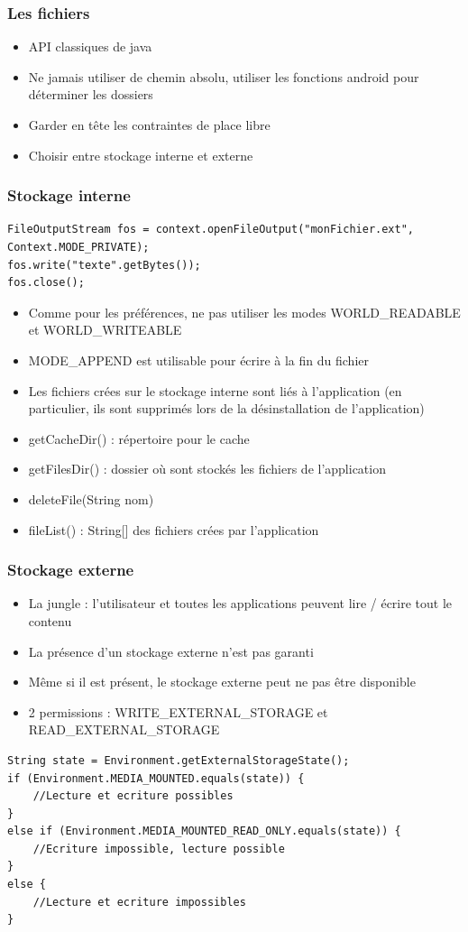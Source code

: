\documentclass{beamer}
\begin{document}
\begin{frame}[fragile]
\frametitle{Les fichiers}
\begin{itemize}
    \item API classiques de java
    \item Ne jamais utiliser de chemin absolu, utiliser les fonctions android pour déterminer les dossiers
    \item Garder en tête les contraintes de place libre
    \item Choisir entre stockage interne et externe
\end{itemize}
\end{frame}
\begin{frame}[fragile]
\frametitle{Stockage interne}
\begin{lstlisting}
FileOutputStream fos = context.openFileOutput("monFichier.ext", Context.MODE_PRIVATE);
fos.write("texte".getBytes());
fos.close();
\end{lstlisting}
\begin{itemize}
    \item Comme pour les préférences, ne pas utiliser les modes WORLD\_READABLE et WORLD\_WRITEABLE
    \item MODE\_APPEND est utilisable pour écrire à la fin du fichier
    \item Les fichiers crées sur le stockage interne sont liés à l'application (en particulier, ils sont supprimés lors de la désinstallation de l'application)
\end{itemize}
\begin{itemize}
    \item getCacheDir() : répertoire pour le cache
    \item getFilesDir() : dossier où sont stockés les fichiers de l'application
    \item deleteFile(String nom)
    \item fileList() : String[] des fichiers crées par l'application
\end{itemize}
\end{frame}
\begin{frame}[fragile]
\frametitle{Stockage externe}
\begin{itemize}
    \item La jungle : l'utilisateur et toutes les applications peuvent lire / écrire tout le contenu
    \item La présence d'un stockage externe n'est pas garanti
    \item Même si il est présent, le stockage externe peut ne pas être disponible
    \item 2 permissions : WRITE\_EXTERNAL\_STORAGE et READ\_EXTERNAL\_STORAGE
\end{itemize}
\begin{lstlisting}
String state = Environment.getExternalStorageState();
if (Environment.MEDIA_MOUNTED.equals(state)) {
    //Lecture et ecriture possibles
} 
else if (Environment.MEDIA_MOUNTED_READ_ONLY.equals(state)) {
    //Ecriture impossible, lecture possible
} 
else {
    //Lecture et ecriture impossibles
}
\end{lstlisting}
\end{frame}
\end{document}
